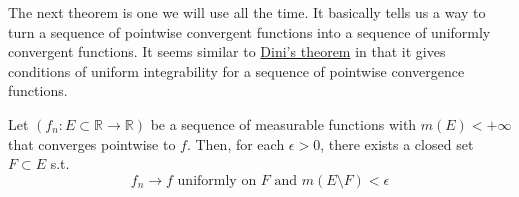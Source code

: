   The next theorem is one we will use all the time. It basically tells us a way to turn a sequence of pointwise convergent functions into a sequence of uniformly convergent functions. It seems similar to \hyperref[real-thm:dini]{Dini's theorem} in that it gives conditions of uniform integrability for a sequence of pointwise convergence functions. 

  \begin{theorem}[Egorov]
    Let $(f_n: E \subset \mathbb{R} \to \mathbb{R})$ be a sequence of measurable functions with $m(E) < +\infty$ that converges pointwise to $f$. Then, for each $\epsilon > 0$, there exists a closed set $F \subset E$  s.t. 
    \begin{equation}
      f_n \to f \text{ uniformly on } F \text{ and } m(E \setminus F) < \epsilon
    \end{equation}
  \end{theorem}
